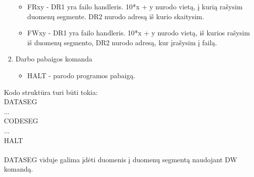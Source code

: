 \begin{enumerate}
\begin{itemize}
		\item FRxy - DR1 yra failo handleris. 10*x + y nurodo vietą, į kurią rašysim duomenų segmente. DR2 nurodo adresą iš kurio skaitysim.
		\item FWxy - DR1 yra failo handleris. 10*x + y nurodo vietą, iš kurios rašysim iš duomenų segmento, DR2 nurodo adresą, kur įrašysim į failą.
		\end{itemize}
	\item Darbo pabaigos komanda
		\begin{itemize}
		\item HALT - parodo programos pabaigą.
		\end{itemize}
	\end{enumerate}
	Kodo struktūra turi būti tokia:\\
	DATASEG\\
	...\\
	CODESEG\\
	...\\
	HALT\\
	\\
	DATASEG viduje galima įdėti duomenis į duomenų segmentą naudojant DW komandą.
\clearpage